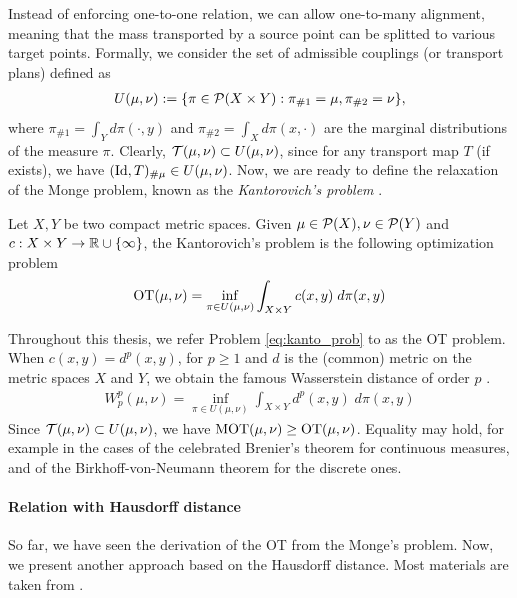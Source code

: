 Instead of enforcing one-to-one relation, we can allow one-to-many alignment,
meaning that the mass transported by a source point can be splitted to various target points.
Formally, we consider the set of admissible couplings (or transport plans) defined as
\begin{align}
  U(\mu, \nu) := \{ \pi \in \mathcal P(X \times Y): \pi_{\# 1} = \mu, \pi_{\# 2} = \nu \},
\end{align}
where $\pi_{\# 1} = \int_Y d \pi(\cdot, y)$ and $\pi_{\# 2} = \int_X d\pi(x, \cdot)$
are the marginal distributions of the measure $\pi$. Clearly, $\mathcal T(\mu, \nu) \subset U(\mu, \nu)$,
since for any transport map $T$ (if exists), we have $(\text{Id}, T)_{\# \mu} \in U(\mu, \nu)$. Now,
we are ready to define the relaxation of the Monge problem,
known as the \textit{Kantorovich's problem} \citep{Kanto42}.
\begin{definition}
  Let $X, Y$ be two compact metric spaces. Given $\mu \in \mathcal P(X), \nu \in \mathcal P(Y)$
  and $c: X \times Y \to \mathbb R \cup \{\infty\}$, the Kantorovich's problem is
  the following optimization problem
  \begin{align}
    \label{eq:kanto_prob}
    \text{OT}(\mu, \nu) = \inf_{\pi \in U(\mu, \nu)} \int_{X \times Y} c(x, y) \; d\pi(x, y)
  \end{align}
\end{definition}
Throughout this thesis, we refer Problem \ref{eq:kanto_prob} to as the OT problem.
When $c(x, y) = d^p(x, y)$, for $p \geq 1$ and $d$ is the (common) metric on the metric spaces
$X$ and $Y$, we obtain the famous Wasserstein distance of order $p$ \citep{Villani03}.
\begin{align}
  W^p_p(\mu, \nu) = \inf_{\pi \in U(\mu, \nu)} \int_{X \times Y} d^p(x, y) \; d\pi(x, y)
\end{align}
Since $\mathcal T(\mu, \nu) \subset U(\mu, \nu)$, we have $\text{MOT}(\mu, \nu) \geq \text{OT}(\mu, \nu)$.
Equality may hold, for example in the cases of the celebrated Brenier's theorem \citep{Brenier87}
for continuous measures, and of the Birkhoff-von-Neumann theorem \citep{Birkhoff46}
for the discrete ones.

\paragraph{Relation with Hausdorff distance}
So far, we have seen the derivation of the OT from the Monge's problem.
Now, we present another approach based on the Hausdorff distance.
Most materials are taken from \citep{Memoli11}.

